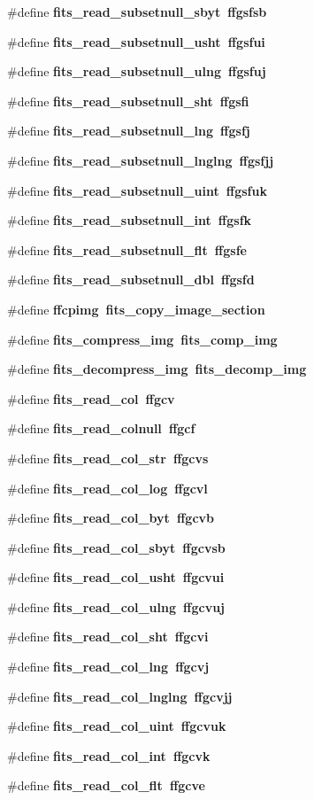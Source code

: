 \begin{CompactItemize}
\#define \bf{fits\_\-read\_\-subsetnull\_\-sbyt}~ffgsfsb
\item 
\#define \bf{fits\_\-read\_\-subsetnull\_\-usht}~ffgsfui
\item 
\#define \bf{fits\_\-read\_\-subsetnull\_\-ulng}~ffgsfuj
\item 
\#define \bf{fits\_\-read\_\-subsetnull\_\-sht}~ffgsfi
\item 
\#define \bf{fits\_\-read\_\-subsetnull\_\-lng}~ffgsfj
\item 
\#define \bf{fits\_\-read\_\-subsetnull\_\-lnglng}~ffgsfjj
\item 
\#define \bf{fits\_\-read\_\-subsetnull\_\-uint}~ffgsfuk
\item 
\#define \bf{fits\_\-read\_\-subsetnull\_\-int}~ffgsfk
\item 
\#define \bf{fits\_\-read\_\-subsetnull\_\-flt}~ffgsfe
\item 
\#define \bf{fits\_\-read\_\-subsetnull\_\-dbl}~ffgsfd
\item 
\#define \bf{ffcpimg}~fits\_\-copy\_\-image\_\-section
\item 
\#define \bf{fits\_\-compress\_\-img}~fits\_\-comp\_\-img
\item 
\#define \bf{fits\_\-decompress\_\-img}~fits\_\-decomp\_\-img
\item 
\#define \bf{fits\_\-read\_\-col}~ffgcv
\item 
\#define \bf{fits\_\-read\_\-colnull}~ffgcf
\item 
\#define \bf{fits\_\-read\_\-col\_\-str}~ffgcvs
\item 
\#define \bf{fits\_\-read\_\-col\_\-log}~ffgcvl
\item 
\#define \bf{fits\_\-read\_\-col\_\-byt}~ffgcvb
\item 
\#define \bf{fits\_\-read\_\-col\_\-sbyt}~ffgcvsb
\item 
\#define \bf{fits\_\-read\_\-col\_\-usht}~ffgcvui
\item 
\#define \bf{fits\_\-read\_\-col\_\-ulng}~ffgcvuj
\item 
\#define \bf{fits\_\-read\_\-col\_\-sht}~ffgcvi
\item 
\#define \bf{fits\_\-read\_\-col\_\-lng}~ffgcvj
\item 
\#define \bf{fits\_\-read\_\-col\_\-lnglng}~ffgcvjj
\item 
\#define \bf{fits\_\-read\_\-col\_\-uint}~ffgcvuk
\item 
\#define \bf{fits\_\-read\_\-col\_\-int}~ffgcvk
\item 
\#define \bf{fits\_\-read\_\-col\_\-flt}~ffgcve

\end{CompactItemize}
